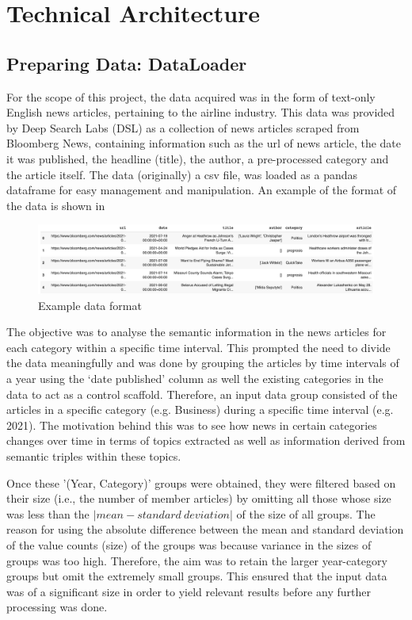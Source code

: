\chapter{Technical Architecture}
\vspace*{-2ex}

\section{Preparing Data: DataLoader} \label{dataloader}

For the scope of this project, the data acquired was in the form of text-only English news articles, pertaining to the airline industry. This data was provided by Deep Search Labs (DSL) as a collection of news articles scraped from Bloomberg News, containing information such as the url of news article, the date it was published, the headline (title), the author, a pre-processed category and the article itself. The data (originally) a csv file, was loaded as a pandas dataframe for easy management and manipulation. An example of the format of the data is shown in~

\begin{figure}[H] 
\centering
\includegraphics[width=0.8\linewidth]{images/dataframe.png}
\caption{Example data format}
\label{dataframe}
\end{figure}

The objective was to analyse the semantic information in the news articles for each category within a specific time interval. This prompted the need to divide the data meaningfully and was done by grouping the articles by time intervals of a year using the `date published' column as well the existing categories in the data to act as a control scaffold. Therefore, an input data group consisted of the articles in a specific category (e.g. Business) during a specific time interval (e.g. 2021). The motivation behind this was to see how news in certain categories changes over time in terms of topics extracted as well as information derived from semantic triples within these topics.

Once these '(Year, Category)' groups were obtained, they were filtered based on their size (i.e., the number of member articles) by omitting all those whose size was less than the $| mean - standard \ deviation |$ of the size of all groups. The reason for using the absolute difference between the mean and standard deviation of the value counts (size) of the groups was because variance in the sizes of groups was too high. Therefore, the aim was to retain the larger year-category groups but omit the extremely small groups. This ensured that the input data was of a significant size in order to yield relevant results before any further processing was done.  


